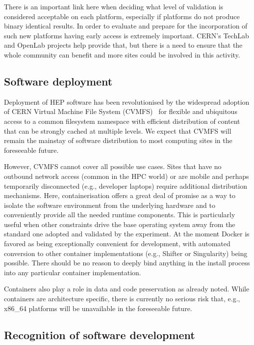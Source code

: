 \documentclass[12pt,a4paper]{article}
\begin{document}
There is an important link here when deciding what level of validation
is considered acceptable on each platform, especially if platforms do
not produce binary identical results. In order to evaluate and prepare
for the incorporation of such new platforms having early access is
extremely important. CERN's TechLab and OpenLab projects help provide
that, but there is a need to ensure that the whole community can benefit
and more sites could be involved in this activity.

\hypertarget{software-deployment}{%
\subsection{Software deployment}\label{software-deployment}}

Deployment of HEP software has been revolutionised by the widespread
adoption of CERN Virtual Machine File System (CVMFS)~\cite{7310920}
for flexible and ubiquitous access to a common
filesystem namespace with efficient distribution of content that can be
strongly cached at multiple levels. We expect that CVMFS will remain the
mainstay of software distribution to most computing sites in the
foreseeable future.

However, CVMFS cannot cover all possible use cases. Sites that have no
outbound network access (common in the HPC world) or are mobile and
perhaps temporarily disconnected (e.g., developer laptops) require
additional distribution mechanisms. Here, containerisation offers a
great deal of promise as a way to isolate the software environment from
the underlying hardware and to conveniently provide all the needed
runtime components. This is particularly useful when other constraints
drive the base operating system away from the standard one adopted and
validated by the experiment. At the moment Docker is favored as being
exceptionally convenient for development, with automated conversion to
other container implementations (e.g., Shifter or Singularity) being
possible. There should be no reason to deeply bind anything in the
install process into any particular container implementation.

Containers also play a role in data and code preservation as already
noted. While containers are architecture specific, there is currently no
serious risk that, e.g., x86\_64 platforms will be unavailable in the
foreseeable future.

\hypertarget{recognition-of-software-development}{%
\subsection{Recognition of software
development}\label{recognition-of-software-development}}
\end{document}
